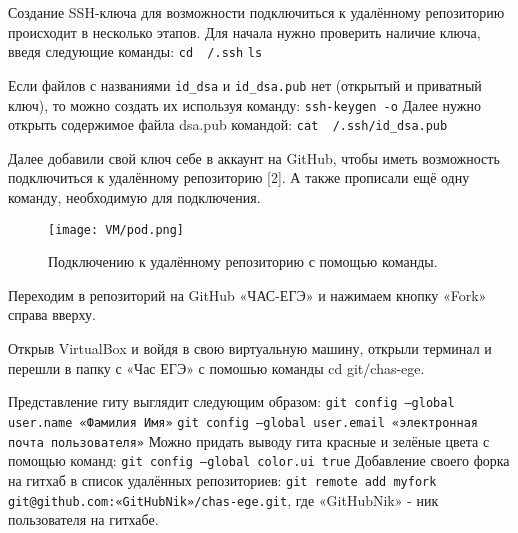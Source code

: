 Создание SSH-ключа для возможности подключиться к удалённому репозиторию происходит в несколько этапов.
Для начала нужно проверить наличие ключа, введя следующие команды:
\newline \texttt{cd ~/.ssh}
\newline \texttt{ls}

Если файлов с названиями \texttt{id\_dsa} и \texttt{id\_dsa.pub} нет (открытый и приватный ключ), то можно создать их используя команду:
\newline  \texttt{ssh-keygen -o}
\newline \quad Далее нужно открыть содержимое файла dsa.pub командой:
\newline  \texttt{cat ~/.ssh/id\_dsa.pub}

Далее добавили свой ключ себе в аккаунт на GitHub, чтобы иметь возможность подключиться к удалённому репозиторию [2]. А также прописали ещё одну команду, необходимую для подключения.

\begin{figure}[h]
		\centering
		\texttt{[image: VM/pod.png]}
\caption{Подключению к удалённому репозиторию с помощью команды.}
\label{ris:image}
\end{figure}

Переходим в репозиторий на GitHub «ЧАС-ЕГЭ» и нажимаем кнопку «Fork» справа вверху.

Открыв VirtualBox и войдя в свою виртуальную машину, открыли терминал и перешли в папку с «Час ЕГЭ» с помошью команды cd git/chas-ege.

Представление гиту выглядит следующим образом:
\newline \texttt{git config ---global user.name «Фамилия Имя»}
\newline \texttt{git config ---global user.email «электронная почта пользователя»}
\newline Можно придать выводу гита красные и зелёные цвета с помощью команд:
\texttt{git config ---global color.ui true}
\newline Добавление своего форка на гитхаб в список удалённых репозиториев:
\texttt{git remote add myfork git@github.com:«GitHubNik»/chas-ege.git}, где «GitHubNik» - ник пользователя на гитхабе. 

